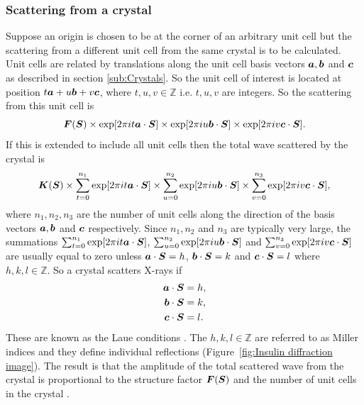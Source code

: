         \subsubsection{Scattering from a crystal}
        \label{subs:Scattering from a crystal}
            Suppose an origin is chosen to be at the corner of an arbitrary unit cell but the scattering from a different unit cell from the same crystal is to be calculated.
            Unit cells are related by translations along the unit cell basis vectors $\boldsymbol{a}, \boldsymbol{b}$ and  $\boldsymbol{c}$ as described in section \ref{sub:Crystals}.
            So the unit cell of interest is located at position $t\boldsymbol{a} + u\boldsymbol{b} + v\boldsymbol{c}$, where $t,u,v \in \mathbb{Z}$ i.e. $t,u,v$ are integers.
            So the scattering from this unit cell is
            \begin{equation}
                \boldsymbol{F}(\boldsymbol{S}) \times \exp[2\pi i t\boldsymbol{a} \cdot \boldsymbol{S}] \times \exp[2\pi i u\boldsymbol{b} \cdot \boldsymbol{S}] \times \exp[2\pi i v\boldsymbol{c} \cdot \boldsymbol{S}].
            \end{equation}
            If this is extended to include all unit cells then the total wave scattered by the crystal is
            \begin{equation}
                \boldsymbol{K}(\boldsymbol{S}) \times \sum_{t=0}^{n_1}\exp[2\pi i t\boldsymbol{a} \cdot \boldsymbol{S}] \times \sum_{u=0}^{n_2}\exp[2\pi i u\boldsymbol{b} \cdot \boldsymbol{S}] \times \sum_{v=0}^{n_3}\exp[2\pi i v\boldsymbol{c} \cdot \boldsymbol{S}],
            \end{equation}
            where $n_1, n_2, n_3$ are the number of unit cells along the direction of the basis vectors $\boldsymbol{a}, \boldsymbol{b}$ and $\boldsymbol{c}$ respectively.
            Since $n_1, n_2$ and $n_3$ are typically very large, the summations
            $\sum_{t=0}^{n_1}\exp[2\pi i t\boldsymbol{a} \cdot \boldsymbol{S}]$, $\sum_{u=0}^{n_2}\exp[2\pi i u\boldsymbol{b} \cdot \boldsymbol{S}]$ and $\sum_{v=0}^{n_3}\exp[2\pi i v\boldsymbol{c} \cdot \boldsymbol{S}]$
            are usually equal to zero unless $\boldsymbol{a} \cdot \boldsymbol{S} = h$, $\boldsymbol{b} \cdot \boldsymbol{S} = k$ and $\boldsymbol{c} \cdot \boldsymbol{S} = l$ where $h,k,l \in \mathbb{Z}$.
            So a crystal scatters X-rays if
            \begin{align}
                \boldsymbol{a} \cdot \boldsymbol{S} &= h, \\
                \boldsymbol{b} \cdot \boldsymbol{S} &= k, \\
                \boldsymbol{c} \cdot \boldsymbol{S} &= l.
                \label{eq:Laue conditions}
            \end{align}
            These are known as the Laue conditions \cite{drenth1999}. The $h,k,l \in \mathbb{Z}$ are referred to as Miller indices and they define individual reflections (Figure~\ref{fig:Insulin diffraction image}). The result is that the amplitude of the total scattered wave from the crystal is proportional to the structure factor $\boldsymbol{F}(\boldsymbol{S})$ and the number of unit cells in the crystal \cite{drenth1999}.

